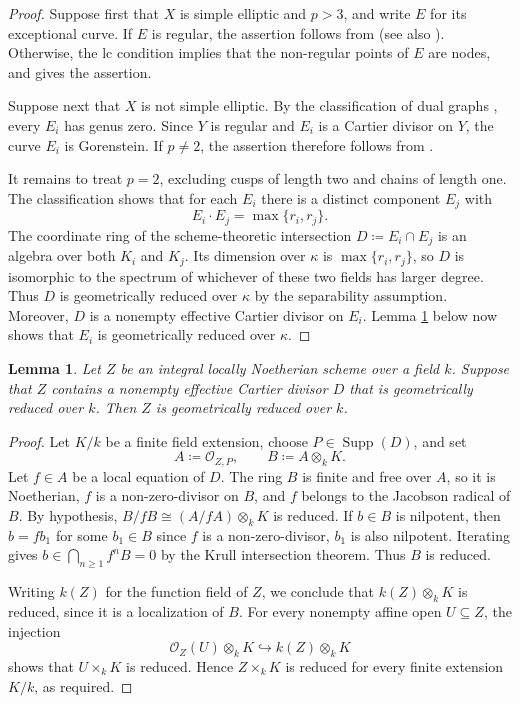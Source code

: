 \documentclass[12pt]{amsart}
\def\ge{\geqslant}
\def\Supp{\operatorname{Supp}}
\def\max{\operatorname{max}}
\newcommand{\sO}{\mathcal{O}}
\theoremstyle{plain}
\newtheorem{lem}[thm]{Lemma}
\theoremstyle{definition}
\theoremstyle{remark}
\newtheorem{defn and notation}[thm]{Definition and Notation}
\theoremstyle{plain}
\numberwithin{equation}{thm}
\begin{document}
\begin{proof}
    Suppose first that $X$ is simple elliptic and $p>3$, and write $E$ for its exceptional curve.
    If $E$ is regular, the assertion follows from \cite[Theorem 1.1]{PW} (see also \cite[Proposition 9.11(2)]{Tanaka(invariants)}).
    Otherwise, the lc condition implies that the non-regular points of $E$ are nodes, and \cite[Corollary 3.10]{Sato23} gives the assertion.

    Suppose next that $X$ is not simple elliptic.
    By the classification of dual graphs \cite[Appendix A]{Sato23}, every $E_i$ has genus zero.
    Since $Y$ is regular and $E_i$ is a Cartier divisor on $Y$, the curve $E_i$ is Gorenstein.
    If $p\ne 2$, the assertion therefore follows from \cite[Lemma 3.3]{Sato23}.

    It remains to treat $p=2$, excluding cusps of length two and chains of length one.
    The classification shows that for each $E_i$ there is a distinct component $E_j$ with
    \[
    E_i\cdot E_j=\max\{r_i,r_j\}.
    \]
    The coordinate ring of the scheme-theoretic intersection $D\coloneqq E_i\cap E_j$ is an algebra over both $K_i$ and $K_j$.
    Its dimension over $\kappa$ is $\max\{r_i,r_j\}$, so $D$ is isomorphic to the spectrum of whichever of these two fields has larger degree.
    Thus $D$ is geometrically reduced over $\kappa$ by the separability assumption.
    Moreover, $D$ is a nonempty effective Cartier divisor on $E_i$.
    Lemma \ref{lem:geom.red} below now shows that $E_i$ is geometrically reduced over $\kappa$.
\end{proof}

\begin{lem}\label{lem:geom.red}
    Let $Z$ be an integral locally Noetherian scheme over a field $k$.
    Suppose that $Z$ contains a nonempty effective Cartier divisor $D$ that is geometrically reduced over $k$.
    Then $Z$ is geometrically reduced over $k$.
\end{lem}
\begin{proof}
    Let $K/k$ be a finite field extension, choose $P\in\Supp(D)$, and set
    \[
    A\coloneqq\sO_{Z,P},\qquad B\coloneqq A\otimes_k K.
    \]
    Let $f\in A$ be a local equation of $D$.
    The ring $B$ is finite and free over $A$, so it is Noetherian, $f$ is a non-zero-divisor on $B$, and $f$ belongs to the Jacobson radical of $B$.
    By hypothesis, $B/fB\cong(A/fA)\otimes_k K$ is reduced.
    If $b\in B$ is nilpotent, then $b=fb_1$ for some $b_1\in B$ since $f$ is a non-zero-divisor, $b_1$ is also nilpotent.
    Iterating gives $b\in\bigcap_{n\ge1}f^nB=0$ by the Krull intersection theorem.
    Thus $B$ is reduced.

    Writing $k(Z)$ for the function field of $Z$, we conclude that $k(Z)\otimes_k K$ is reduced, since it is a localization of $B$.
    For every nonempty affine open $U\subseteq Z$, the injection
    \[
    \sO_Z(U)\otimes_k K\hookrightarrow k(Z)\otimes_k K
    \]
    shows that $U\times_k K$ is reduced.
    Hence $Z\times_k K$ is reduced for every finite extension $K/k$, as required.
\end{proof}
\end{document}
